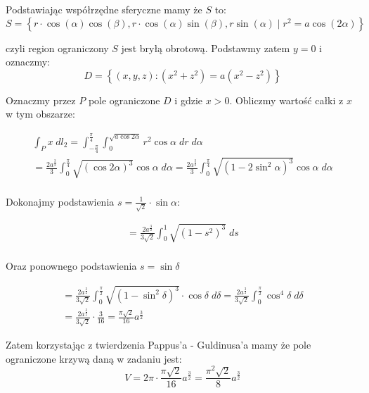 \documentclass[11pt]{scrartcl}
\begin{document}
     Podstawiając współrzędne sferyczne mamy że $S$ to:
     \[
         S = \left \{ r \cdot \cos(\alpha ) \cos(\beta ), r \cdot \cos(\alpha ) \sin(\beta ) , r \sin(\alpha) \mid r^2 = a \cos (2 \alpha ) \right \}
     \]

     czyli region ograniczony $S$ jest bryłą obrotową. Podstawmy zatem $y = 0$ i oznaczmy:
     \[
         D = \left \{ \left ( x, y, z \right ) : \left ( x^2 + z^2 \right ) = a \left ( x^2 - z^2 \right ) \right \}
     \]

    Oznaczmy przez $P$ pole ograniczone $D$ i gdzie $x > 0$. Obliczmy wartość całki z $x$ w tym obszarze:

    \begin{gather*}
        \int_P x \; dl_2 = \int_{-\frac{\pi}{4}}^{\frac{\pi}{4}} \int_0^{\sqrt{a \cos 2\alpha } } r^2 \cos \alpha  \; dr \; d \alpha \\
        = \frac{2a^{\frac{3}{2}}}{3} \int_0^{\frac{\pi}{4}} \sqrt{\left ( \cos 2 \alpha  \right )^3} \cos \alpha  \; d \alpha 
        = \frac{2a^{\frac{3}{2}}}{3} \int_0^{\frac{\pi}{4}} \sqrt{\left ( 1 - 2 \sin^2 \alpha  \right )^3} \cos \alpha  \; d \alpha \\  
    \end{gather*}

    Dokonajmy podstawienia $s = \frac{1}{\sqrt{2} } \cdot \sin \alpha $:
    
    \begin{gather*}
         = \frac{2a^{\frac{3}{2}}}{3 \sqrt{2} } \int_0^1 \sqrt{\left ( 1 - s^2  \right )^3} \; ds \\  
    \end{gather*}

    Oraz ponownego podstawienia $s = \sin \delta$

    \begin{gather*}
        = \frac{2a^{\frac{3}{2}}}{3 \sqrt{2} } \int_0^{\frac{\pi}{2}} \sqrt{\left ( 1 - \sin^2 \delta  \right )^3} \cdot \cos \delta \; d \delta
        = \frac{2a^{\frac{3}{2}}}{3 \sqrt{2} } \int_0^{\frac{\pi}{2}} \cos^4 \delta \; d \delta \\  
        = \frac{2a^{\frac{3}{2}}}{3 \sqrt{2} } \cdot \frac{3}{16} = \frac{\pi \sqrt{2} }{16} a^{\frac{3}{2}} 
    \end{gather*}

    Zatem korzystając z twierdzenia Pappus'a - Guldinusa'a mamy że pole ograniczone krzywą daną w zadaniu jest:
    \[
        V = 2 \pi \cdot  \frac{\pi \sqrt{2} }{16} a^{\frac{3}{2}} = \frac{\pi^2 \sqrt{2} }{8} a^{\frac{3}{2}}
    \]
\end{document}
